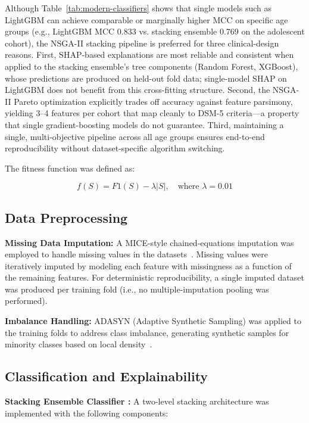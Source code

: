 \documentclass[pdflatex,sn-vancouver-num]{sn-jnl}
\begin{document}
Although Table~\ref{tab:modern-classifiers} shows that single models such as LightGBM can achieve comparable or marginally higher MCC on specific age groups (e.g., LightGBM MCC 0.833 vs. stacking ensemble 0.769 on the adolescent cohort), the NSGA-II stacking pipeline is preferred for three clinical-design reasons. First, SHAP-based explanations are most reliable and consistent when applied to the stacking ensemble's tree components (Random Forest, XGBoost), whose predictions are produced on held-out fold data; single-model SHAP on LightGBM does not benefit from this cross-fitting structure. Second, the NSGA-II Pareto optimization explicitly trades off accuracy against feature parsimony, yielding 3--4 features per cohort that map cleanly to DSM-5 criteria---a property that single gradient-boosting models do not guarantee. Third, maintaining a single, multi-objective pipeline across all age groups ensures end-to-end reproducibility without dataset-specific algorithm switching.

The fitness function was defined as:

\[
f(S) = F1(S) - \lambda |S|, \quad \text{where } \lambda = 0.01
\]

\subsection{Data Preprocessing}\label{data-preprocessing}

\textbf{Missing Data Imputation:} A MICE-style chained-equations imputation was employed to handle missing values in the datasets~\textbf{\cite{ref50}}. Missing values were iteratively imputed by modeling each feature with missingness as a function of the remaining features. For deterministic reproducibility, a single imputed dataset was produced per training fold (i.e., no multiple-imputation pooling was performed).

\textbf{Imbalance Handling:} ADASYN (Adaptive Synthetic Sampling) was applied to the training folds to address class imbalance, generating synthetic samples for minority classes based on local density~\textbf{\cite{ref51,ref52}}.

\subsection{Classification and Explainability}\label{classification-and-explainability}

\textbf{Stacking Ensemble Classifier \cite{ref53}:} A two-level stacking architecture was implemented with the following components:
\end{document}
